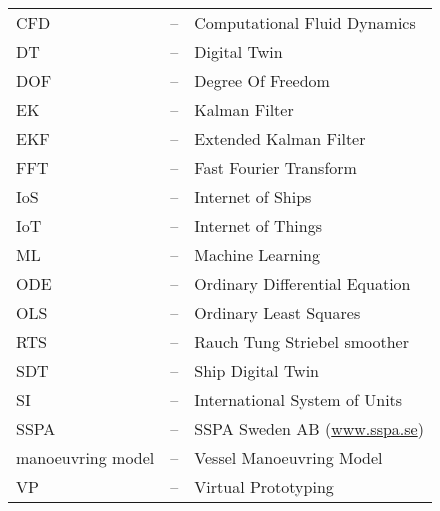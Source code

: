 
\begin{tabular}{ l c l }
CFD & -- & Computational Fluid Dynamics\\
DT  & -- & Digital Twin\\
DOF & -- & Degree Of Freedom\\
EK & -- & Kalman Filter \\
EKF & -- & Extended Kalman Filter \\
FFT & -- & Fast Fourier Transform\\
IoS & -- & Internet of Ships \\
IoT & -- & Internet of Things \\
ML & -- & Machine Learning \\
ODE & -- & Ordinary Differential Equation\\
OLS & -- & Ordinary Least Squares\\
RTS & -- & Rauch Tung Striebel smoother \\
SDT  & -- & Ship Digital Twin\\
SI  & -- & International System of Units\\
SSPA & -- & SSPA Sweden AB (\url{www.sspa.se})\\
manoeuvring model & -- & Vessel Manoeuvring Model\\
VP & -- & Virtual Prototyping \\
\end{tabular}

